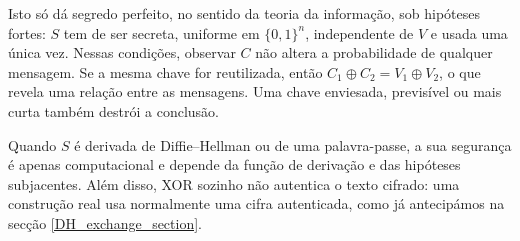 \begin{center}
\end{center}

Isto só dá segredo perfeito, no sentido da teoria da informação, sob hipóteses
fortes: \(S\) tem de ser secreta, uniforme em \(\{0,1\}^n\), independente de
\(V\) e usada uma única vez. Nessas condições, observar \(C\) não altera a
probabilidade de qualquer mensagem. Se a mesma chave for reutilizada, então
\(C_1\oplus C_2=V_1\oplus V_2\), o que revela uma relação entre as mensagens.
Uma chave enviesada, previsível ou mais curta também destrói a conclusão.

Quando \(S\) é derivada de Diffie--Hellman ou de uma palavra-passe, a sua
segurança é apenas computacional e depende da função de derivação e das
hipóteses subjacentes. Além disso, XOR sozinho não autentica o texto cifrado:
uma construção real usa normalmente uma cifra autenticada, como já antecipámos
na secção \ref{DH_exchange_section}.

